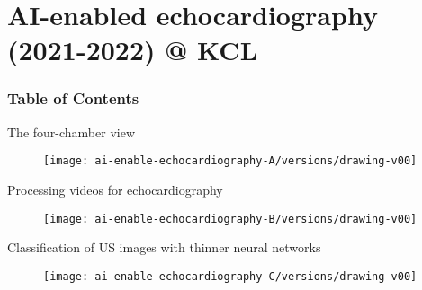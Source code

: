 
\section{AI-enabled echocardiography (2021-2022) @ KCL}


\begin{frame}
      \frametitle{Table of Contents}
      \tableofcontents[currentsection]
  \end{frame}


{

\begin{frame}{The four-chamber view}
      \begin{figure}
        \centering
        \texttt{[image: ai-enable-echocardiography-A/versions/drawing-v00]}
      \end{figure}
\end{frame}
}


{

\begin{frame}{Processing videos for echocardiography}
      \begin{figure}
        \centering
        \texttt{[image: ai-enable-echocardiography-B/versions/drawing-v00]}
      \end{figure}
\end{frame}
}


{

\begin{frame}{Classification of US images with thinner neural networks}
      \begin{figure}
        \centering
        \texttt{[image: ai-enable-echocardiography-C/versions/drawing-v00]}
      \end{figure}
\end{frame}
}

